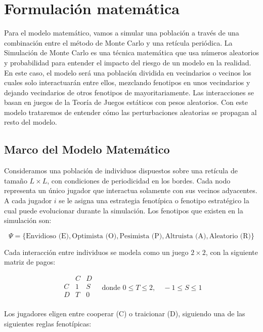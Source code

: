 \documentclass[a4paper,12pt]{report}
\begin{document}
\chapter{Formulación matemática}

Para el modelo matemático, vamos a simular una población a través de una combinación entre el método de Monte Carlo y una retícula periódica.
La Simulación de Monte Carlo es una técnica matemática que usa números aleatorios y probabilidad para entender el impacto del riesgo de un modelo en la realidad.
En este caso, el modelo será una población dividida en vecindarios o vecinos los cuales solo interactuarán entre ellos, mezclando fenotipos en unos vecindarios y dejando vecindarios de otros fenotipos de mayoritariamente.
Las interacciones se basan en juegos de la Teoría de Juegos estáticos con pesos aleatorios.
Con este modelo trataremos de entender cómo las perturbaciones aleatorias se propagan al resto del modelo.

\section{Marco del Modelo Matemático}

Consideramos una población de individuos dispuestos sobre una retícula de tamaño \( L \times L\), con condiciones de periodicidad en los bordes. Cada nodo representa un único jugador que interactua solamente con sus vecinos adyacentes.
A cada jugador \( i \) se le asigna una estrategia fenotípica o fenotipo estratégico la cual puede evolucionar durante la simulación. Los fenotipos que existen en la simulación son:

\[
\Psi = \{ \text{Envidioso (E)}, \text{Optimista (O)}, \text{Pesimista (P)}, \text{Altruista (A)}, \text{Aleatorio (R)} \}
\]

Cada interacción entre individuos se modela como un juego \( 2 \times 2 \), con la siguiente matriz de pagos:

\[
\begin{array}{c|cc}
  & C & D \\
\hline
C & 1 & S \\
D & T & 0 \\
\end{array}
\quad \text{donde } 0 \leq T \leq 2, \quad -1 \leq S \leq 1
\]

Los jugadores eligen entre cooperar (C) o traicionar (D), siguiendo una de las siguientes reglas fenotípicas:
\end{document}

